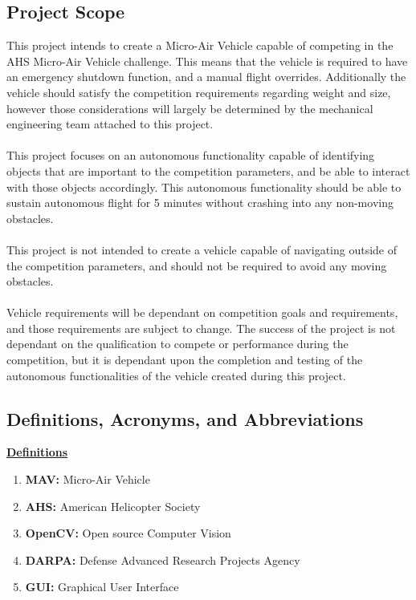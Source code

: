 \documentclass[onecolumn, draftclsnofoot,10pt, compsoc]{IEEEtran}
\begin{document}
\subsection{Project Scope}
This project intends to create a Micro-Air Vehicle capable of competing in the AHS Micro-Air Vehicle challenge.\cite{r2} This means that the vehicle is required to have an emergency shutdown function, and a manual flight overrides. Additionally the vehicle should satisfy the competition requirements regarding weight and size, however those considerations will largely be determined by the mechanical engineering team attached to this project.
 \\ \\
This project focuses on an autonomous functionality capable of identifying objects that are important to the competition parameters, and be able to interact with those objects accordingly. This autonomous functionality should be able to sustain autonomous flight for 5 minutes without crashing into any non-moving obstacles.
\\ \\
This project is not intended to create a vehicle capable of navigating outside of the competition parameters, and should not be required to avoid any moving obstacles.
\\ \\
Vehicle requirements will be dependant on competition goals and requirements, and those requirements are subject to change. The success of the project is not dependant on the qualification to compete or performance during the competition, but it is dependant upon the completion and testing of the autonomous functionalities of the vehicle created during this project.


\subsection{Definitions, Acronyms, and Abbreviations}

\underline{\textbf{Definitions}}
\begin{enumerate}
\item \textbf{MAV: } Micro-Air Vehicle
\item \textbf{AHS: } American Helicopter Society
\item \textbf{OpenCV: } Open source Computer Vision
\item \textbf{DARPA: } Defense Advanced Research Projects Agency
\item \textbf{GUI: } Graphical User Interface

\end{enumerate}
\end{document}
